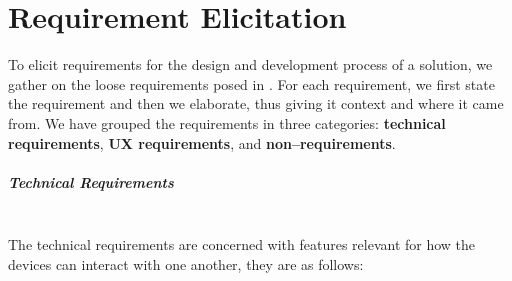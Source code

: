 \chapter{Requirement Elicitation}\label{cha:requirement_elicitation}
To elicit requirements for the design and development process of a solution, we gather on the loose requirements posed in .
For each requirement, we first state the requirement and then we elaborate, thus giving it context and where it came from.
We have grouped the requirements in three categories: \textbf{technical requirements}, \textbf{\ac{UX} requirements}, and \textbf{non--requirements}.

\paragraph{Technical Requirements} \hfill\\
The technical requirements are concerned with features relevant for how the devices can interact with one another, they are as follows:
